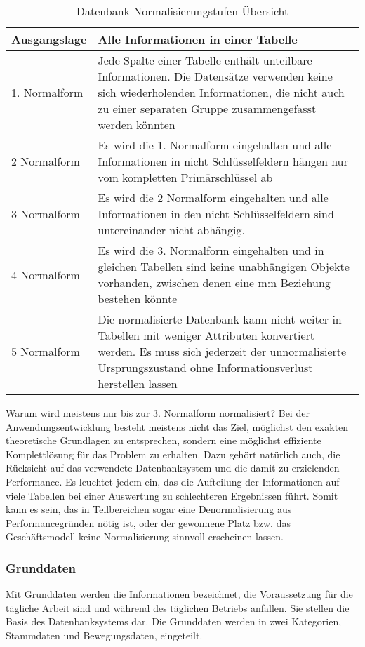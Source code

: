 \begin{table*}[ht]
	\centering
		\begin{tabular}[h]{|p{}|p{}|}
		\hline
Ausgangslage & Alle Informationen in einer Tabelle \\
    \hline
1. Normalform & Jede Spalte einer Tabelle enthält unteilbare Informationen. Die Datensätze verwenden keine sich wiederholenden Informationen, die nicht auch zu einer separaten Gruppe zusammengefasst werden könnten \\
2 Normalform & Es wird die 1. Normalform eingehalten und alle Informationen in nicht Schlüsselfeldern hängen nur vom kompletten Primärschlüssel ab\\
3 Normalform & Es wird die 2 Normalform eingehalten und alle Informationen in den nicht Schlüsselfeldern sind untereinander nicht abhängig. \\
4 Normalform & Es wird die 3. Normalform eingehalten und in gleichen Tabellen sind keine unabhängigen Objekte vorhanden, zwischen denen eine m:n Beziehung bestehen könnte \\
5 Normalform & Die normalisierte Datenbank kann nicht weiter in Tabellen mit weniger Attributen konvertiert werden. Es muss sich jederzeit der unnormalisierte Ursprungszustand ohne Informationsverlust herstellen lassen \\
\hline
		\end{tabular}
	\caption{Datenbank Normalisierungstufen Übersicht}
	\label{tab:Normalisierung}
\end{table*}

Warum wird meistens nur bis zur 3. Normalform normalisiert? Bei der Anwendungsentwicklung besteht meistens nicht das Ziel, möglichst den exakten theoretische Grundlagen zu entsprechen, sondern eine möglichst effiziente Komplettlösung für das Problem zu erhalten. Dazu gehört natürlich auch, die Rücksicht auf das verwendete Datenbanksystem und die damit zu erzielenden Performance. Es leuchtet jedem ein, das die Aufteilung der Informationen auf viele Tabellen bei einer Auswertung zu schlechteren Ergebnissen führt. Somit kann es sein, das in Teilbereichen sogar eine Denormalisierung aus Performancegründen nötig ist, oder der gewonnene Platz bzw. das Geschäftsmodell keine Normalisierung sinnvoll erscheinen lassen.

\subsubsection{Grunddaten}
Mit Grunddaten werden die Informationen bezeichnet, die Voraussetzung für die tägliche Arbeit sind und während des täglichen Betriebs anfallen. Sie stellen die Basis des Datenbanksystems dar. Die Grunddaten werden in zwei Kategorien, Stammdaten und Bewegungsdaten, eingeteilt.


